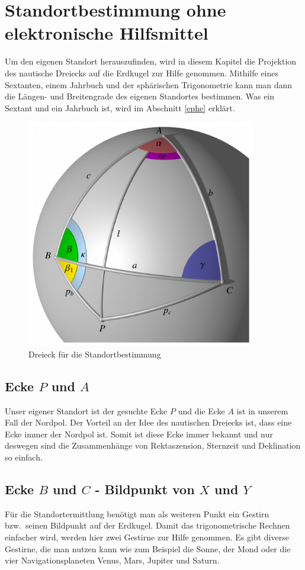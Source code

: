 \section{Standortbestimmung ohne elektronische Hilfsmittel}
\label{sta}
Um den eigenen Standort herauszufinden, wird in diesem Kapitel die Projektion des nautische Dreiecks auf die Erdkugel zur Hilfe genommen.
Mithilfe eines Sextanten, einem Jahrbuch und der sphärischen Trigonometrie kann man dann die Längen- und Breitengrade des eigenen Standortes bestimmen.
Was ein Sextant und ein Jahrbuch ist, wird im Abschnitt \ref{ephe} erklärt.
%
\begin{figure}
\centering
		\includegraphics[width=10cm]{papers/nav/bilder/dreieck.pdf}
		\caption[Dreieck für die Standortbestimmung]{Dreieck für die Standortbestimmung}
		\label{d1}
\end{figure}




\subsection{Ecke $P$ und $A$}
Unser eigener Standort ist der gesuchte Ecke $P$ und die Ecke $A$ ist in unserem Fall der Nordpol.
Der Vorteil an der Idee des nautischen Dreiecks ist, dass eine Ecke immer der Nordpol ist.
Somit ist diese Ecke immer bekannt und nur deswegen sind die Zusammenhänge von Rektaszension, Sternzeit und Deklination so einfach.

\subsection{Ecke $B$ und $C$ - Bildpunkt von $X$ und $Y$}
Für die Standortermittlung benötigt man als weiteren Punkt ein Gestirn
bzw.~seinen Bildpunkt auf der Erdkugel. 
Damit das trigonometrische Rechnen einfacher wird, werden hier zwei Gestirne zur Hilfe genommen.
Es gibt diverse Gestirne, die man nutzen kann wie zum Beispiel die Sonne, der Mond oder die vier Navigationsplaneten Venus, Mars, Jupiter und Saturn.


